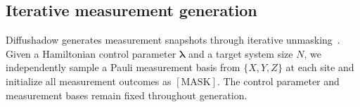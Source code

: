 \documentclass[pdflatex,sn-nature]{sn-jnl}%
\theoremstyle{thmstyleone}%
\theoremstyle{thmstyletwo}%
\theoremstyle{thmstylethree}%
\begin{document}



\subsection{Iterative measurement generation}
\label{sec:method_generation}

Diffushadow generates measurement snapshots through iterative unmasking~\cite{li2026multimodal}. Given a Hamiltonian control parameter \(\boldsymbol{\lambda}\) and a target system size \(N\), we independently sample a Pauli measurement basis from \(\{X,Y,Z\}\) at each site and initialize all measurement outcomes as \([\mathrm{MASK}]\). The control parameter and measurement bases remain fixed throughout generation.
\end{document}
